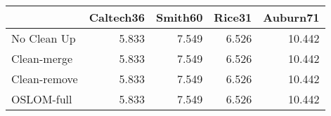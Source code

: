 \begin{tabular}{lrrrr}
\toprule
{} & Caltech36 & Smith60 & Rice31 & Auburn71 \\
\midrule
No Clean Up  &     5.833 &   7.549 &  6.526 &   10.442 \\
Clean-merge  &     5.833 &   7.549 &  6.526 &   10.442 \\
Clean-remove &     5.833 &   7.549 &  6.526 &   10.442 \\
OSLOM-full   &     5.833 &   7.549 &  6.526 &   10.442 \\
\bottomrule
\end{tabular}

